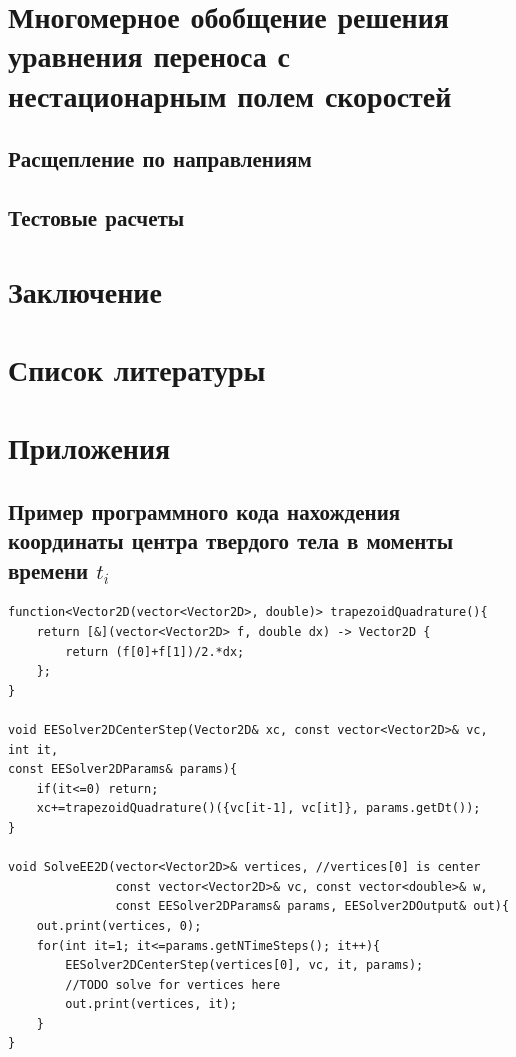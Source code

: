 \documentclass[12pt,a4paper]{article}
\begin{document}
\section{Многомерное обобщение решения уравнения переноса с нестационарным полем скоростей}
\subsection{Расщепление по направлениям}
\subsection{Тестовые расчеты}

\section{Заключение}

\section{Список литературы}

\section{Приложения}
\subsection{Пример программного кода нахождения координаты центра твердого тела в моменты времени $t_i$}
\label{code:xc}
\begin{lstlisting}
function<Vector2D(vector<Vector2D>, double)> trapezoidQuadrature(){
    return [&](vector<Vector2D> f, double dx) -> Vector2D {
        return (f[0]+f[1])/2.*dx;
    };
}

void EESolver2DCenterStep(Vector2D& xc, const vector<Vector2D>& vc, int it,
const EESolver2DParams& params){
    if(it<=0) return;
    xc+=trapezoidQuadrature()({vc[it-1], vc[it]}, params.getDt());
}

void SolveEE2D(vector<Vector2D>& vertices, //vertices[0] is center
               const vector<Vector2D>& vc, const vector<double>& w,
               const EESolver2DParams& params, EESolver2DOutput& out){
    out.print(vertices, 0);
    for(int it=1; it<=params.getNTimeSteps(); it++){
        EESolver2DCenterStep(vertices[0], vc, it, params);
        //TODO solve for vertices here
        out.print(vertices, it);
    }
}
\end{lstlisting}
\end{document}
